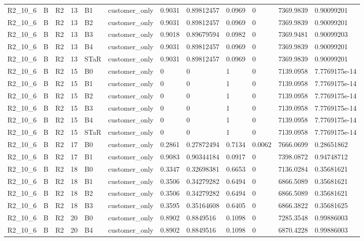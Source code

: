 \begin{longtable}{llllllllllll}
R2\_10\_6 & B & R2 & 13 & B1 & customer\_only & 0.9031 & 0.89812457 & 0.0969 & 0 & 7369.9839 & 0.90099201 \\
R2\_10\_6 & B & R2 & 13 & B2 & customer\_only & 0.9031 & 0.89812457 & 0.0969 & 0 & 7369.9839 & 0.90099201 \\
R2\_10\_6 & B & R2 & 13 & B3 & customer\_only & 0.9018 & 0.89679594 & 0.0982 & 0 & 7369.9481 & 0.90099203 \\
R2\_10\_6 & B & R2 & 13 & B4 & customer\_only & 0.9031 & 0.89812457 & 0.0969 & 0 & 7369.9839 & 0.90099201 \\
R2\_10\_6 & B & R2 & 13 & STaR & customer\_only & 0.9031 & 0.89812457 & 0.0969 & 0 & 7369.9839 & 0.90099201 \\
R2\_10\_6 & B & R2 & 15 & B0 & customer\_only & 0 & 0 & 1 & 0 & 7139.0958 & 7.7769175e-14 \\
R2\_10\_6 & B & R2 & 15 & B1 & customer\_only & 0 & 0 & 1 & 0 & 7139.0958 & 7.7769175e-14 \\
R2\_10\_6 & B & R2 & 15 & B2 & customer\_only & 0 & 0 & 1 & 0 & 7139.0958 & 7.7769175e-14 \\
R2\_10\_6 & B & R2 & 15 & B3 & customer\_only & 0 & 0 & 1 & 0 & 7139.0958 & 7.7769175e-14 \\
R2\_10\_6 & B & R2 & 15 & B4 & customer\_only & 0 & 0 & 1 & 0 & 7139.0958 & 7.7769175e-14 \\
R2\_10\_6 & B & R2 & 15 & STaR & customer\_only & 0 & 0 & 1 & 0 & 7139.0958 & 7.7769175e-14 \\
R2\_10\_6 & B & R2 & 17 & B0 & customer\_only & 0.2861 & 0.27872494 & 0.7134 & 0.0062 & 7666.0699 & 0.28651862 \\
R2\_10\_6 & B & R2 & 17 & B1 & customer\_only & 0.9083 & 0.90344184 & 0.0917 & 0 & 7398.0872 & 0.94748712 \\
R2\_10\_6 & B & R2 & 18 & B0 & customer\_only & 0.3347 & 0.32698381 & 0.6653 & 0 & 7136.0284 & 0.35681621 \\
R2\_10\_6 & B & R2 & 18 & B1 & customer\_only & 0.3506 & 0.34279282 & 0.6494 & 0 & 6866.5089 & 0.35681621 \\
R2\_10\_6 & B & R2 & 18 & B2 & customer\_only & 0.3506 & 0.34279282 & 0.6494 & 0 & 6866.5089 & 0.35681621 \\
R2\_10\_6 & B & R2 & 18 & B3 & customer\_only & 0.3595 & 0.35164608 & 0.6405 & 0 & 6866.3822 & 0.35681625 \\
R2\_10\_6 & B & R2 & 20 & B0 & customer\_only & 0.8902 & 0.8849516 & 0.1098 & 0 & 7285.3548 & 0.99886003 \\
R2\_10\_6 & B & R2 & 20 & B4 & customer\_only & 0.8902 & 0.8849516 & 0.1098 & 0 & 6870.4228 & 0.99886003 \\

\end{longtable}
